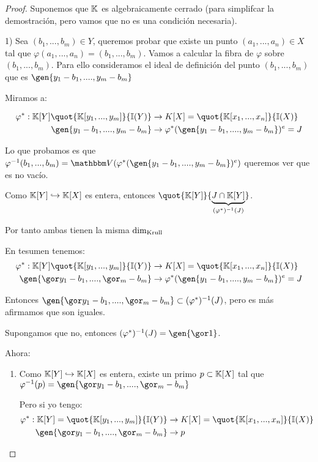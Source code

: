 \begin{proof}
	Suponemos que $\mathbb{K}$ es algebraicamente cerrado (para simplifcar la demostración, pero vamos que no es una condición necesaria).

	1) Sea $(b_1,...,b_m) \in Y$, queremos probar que existe un punto $(a_1,...,a_n) \in X$ tal que $\varphi(a_1,...,a_n)=(b_1,...,b_m)$. Vamos a calcular la fibra de $\varphi$ sobre $(b_1,...,b_m)$. Para ello consideramos el ideal de definición del punto $(b_1,...,b_m)$ que es $\gen{y_1-b_1,....,y_m-b_m}$

	Miramos a:

	\begin{align*}
		\varphi^*: \K[Y]  \quot{\K[y_1,...,y_m]}{\I(Y)}& \rightarrow K[X] = \quot{\K[x_1,...,x_n]}{\I(X)} \\
		\gen{y_1-b_1,....,y_m-b_m} & \rightarrow \varphi^*(\gen{y_1-b_1,....,y_m-b_m})^e=J
	\end{align*}

	Lo que probamos es que $\varphi^{-1}(b_1,...,b_m)= \V(\varphi^*(\gen{y_1-b_1,....,y_m-b_m})^e)$ queremos ver que es no vacío.

	Como $\mathbb{K}[Y] \hookrightarrow \mathbb{K}[X]$ es entera, entonces $\quot{\K[Y]}{\underbrace{J \cap \K[Y]}_{(\varphi^*)^{-1}(J)}}$.

	Por tanto ambas tienen la misma $\dim_{\mathrm{Krull}}$

	En tesumen tenemos:
	\begin{align*}
		\varphi^*: \K[Y]  \quot{\K[y_1,...,y_m]}{\I(Y)}& \rightarrow K[X] = \quot{\K[x_1,...,x_n]}{\I(X)} \\
		\gen{\cls{y_1-b_1},....,\cls{_m-b_m}} & \rightarrow \varphi^*(\gen{y_1-b_1,....,y_m-b_m})^e=J
	\end{align*}

	Entonces $\gen{\cls{y_1-b_1},....,\cls{_m-b_m}} \subset (\varphi^*)^{-1}(J)$, pero es más afirmamos que son iguales.

	Supongamos que no, entonces $(\varphi^*)^{-1}(J)=\gen{\cls{1}}$.

	Ahora:

	\begin{enumerate}
		\item Como $\mathbb{K}[Y] \hookrightarrow \mathbb{K}[X]$ es entera, existe un primo $p \subset \mathbb{K}[X]$ tal que $\varphi^{-1}(p)=	\gen{\cls{y_1-b_1},....,\cls{_m-b_m}}$

		Pero si yo tengo:
		\begin{align*}
			\varphi^*: \K[Y] =  \quot{\K[y_1,...,y_m]}{\I(Y)}& \rightarrow K[X] = \quot{\K[x_1,...,x_n]}{\I(X)} \\
			\gen{\cls{y_1-b_1},....,\cls{_m-b_m}} & \rightarrow p
		\end{align*}


\end{enumerate}
\end{proof}

